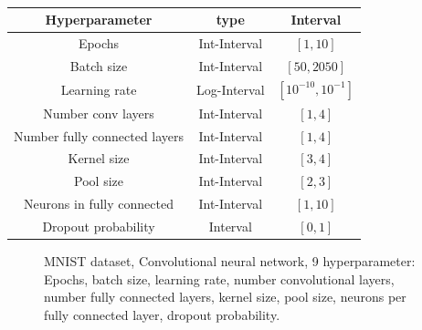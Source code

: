 \begin{table}[htb!]
	\caption{  }
	\label{tab:hyperparameter_space_mnist}
	\centering
	\begin{tabular}{| c c c |} 
		\hline
		Hyperparameter & type & Interval \\ 
		\hline
	 	Epochs & Int-Interval & $ [1,10] $ \\ 
	 	Batch size & Int-Interval & $ [50,2050] $ \\ 
	 	Learning rate & Log-Interval & $ [10^{-10},10^{-1}] $ \\ 
	 	Number conv layers & Int-Interval & $ [1,4] $ \\ 
	 	Number fully connected layers & Int-Interval & $ [1,4] $ \\ 
	 	Kernel size & Int-Interval & $ [3,4] $ \\ 
	 	Pool size & Int-Interval & $ [2,3] $ \\ 
	 	Neurons in fully connected & Int-Interval & $ [1,10] $ \\ 
	 	Dropout probability & Interval & $ [0,1] $ \\ 
		\hline
	\end{tabular}
\end{table}





\begin{figure}[htb!]
	\centering
	\caption{ MNIST dataset, Convolutional neural network, 9 hyperparameter: Epochs, batch size, learning rate, number convolutional layers, number fully connected layers, kernel size, pool size, neurons per fully connected layer, dropout probability. }	
	\label{fig:MNIST_results}
\end{figure}


